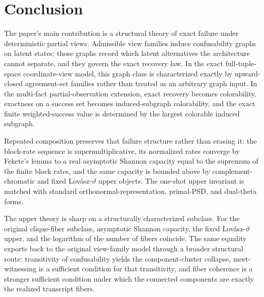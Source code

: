\section{Conclusion}\label{sec:conclusion}

The paper's main contribution is a structural theory of exact failure under deterministic partial views. Admissible view families induce confusability graphs on latent states; those graphs record which latent alternatives the architecture cannot separate, and they govern the exact recovery law. In the exact full-tuple-space coordinate-view model, this graph class is characterized exactly by upward-closed agreement-set families rather than treated as an arbitrary graph input. In the multi-fact partial-observation extension, exact recovery becomes colorability, exactness on a success set becomes induced-subgraph colorability, and the exact finite weighted-success value is determined by the largest colorable induced subgraph.

Repeated composition preserves that failure structure rather than erasing it: the block-rate sequence is supermultiplicative, its normalized rates converge by Fekete's lemma to a real asymptotic Shannon capacity equal to the supremum of the finite block rates, and the same capacity is bounded above by complement-chromatic and fixed Lov\'asz-$\vartheta$ upper objects. The one-shot upper invariant is matched with standard orthonormal-representation, primal-PSD, and dual-theta forms.

The upper theory is sharp on a structurally characterized subclass. For the original clique-fiber subclass, asymptotic Shannon capacity, the fixed Lov\'asz-$\vartheta$ upper, and the logarithm of the number of fibers coincide. The same equality exports back to the original view-family model through a broader structural route: transitivity of confusability yields the component-cluster collapse, meet-witnessing is a sufficient condition for that transitivity, and fiber coherence is a stronger sufficient condition under which the connected components are exactly the realized transcript fibers.

